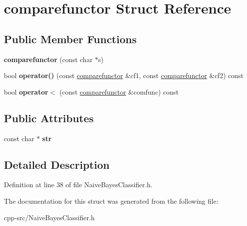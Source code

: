 \hypertarget{structcomparefunctor}{\section{comparefunctor Struct Reference}
\label{structcomparefunctor}
}
\subsection*{Public Member Functions}
\begin{DoxyCompactItemize}
\item 
\hypertarget{structcomparefunctor_afb46e32167b8b8677f73574c4edefec9}{{\bfseries comparefunctor} (const char $\ast$s)}\label{structcomparefunctor_afb46e32167b8b8677f73574c4edefec9}

\item 
\hypertarget{structcomparefunctor_a44bc31ef613a24b39a059ba7d7bde781}{bool {\bfseries operator()} (const \hyperlink{structcomparefunctor}{comparefunctor} \&cf1, const \hyperlink{structcomparefunctor}{comparefunctor} \&cf2) const }\label{structcomparefunctor_a44bc31ef613a24b39a059ba7d7bde781}

\item 
\hypertarget{structcomparefunctor_a0c26553337da801a619a97601d98afaf}{bool {\bfseries operator$<$} (const \hyperlink{structcomparefunctor}{comparefunctor} \&comfunc) const }\label{structcomparefunctor_a0c26553337da801a619a97601d98afaf}

\end{DoxyCompactItemize}
\subsection*{Public Attributes}
\begin{DoxyCompactItemize}
\item 
\hypertarget{structcomparefunctor_a0673576d241aead2afe581f2d7575ff6}{const char $\ast$ {\bfseries str}}\label{structcomparefunctor_a0673576d241aead2afe581f2d7575ff6}

\end{DoxyCompactItemize}


\subsection{Detailed Description}


Definition at line 38 of file Naive\-Bayes\-Classifier.\-h.



The documentation for this struct was generated from the following file\-:\begin{DoxyCompactItemize}
\item 
cpp-\/src/Naive\-Bayes\-Classifier.\-h\end{DoxyCompactItemize}
